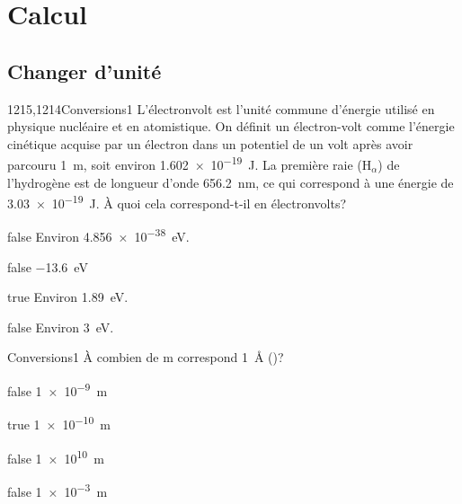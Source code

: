\documentclass[11pt]{article}
\begin{document}
\tableofcontents

\section{Calcul}
	\subsection{Changer d'unité}
		\begin{question}{1215,1214}{Conversions}{1}{}
            L'électronvolt est l'unité commune d'énergie utilisé en physique nucléaire et en atomistique. On définit un électron-volt comme l'énergie cinétique acquise par un électron dans un potentiel de un volt après avoir parcouru \SI{1}{\meter}, soit environ \SI{1.602e-19}{\joule}. La première raie (H$_\alpha$) de l'hydrogène est de longueur d'onde \SI{656.2}{\nano\meter}, ce qui correspond à une énergie de \SI{3.03e-19}{\joule}. À quoi cela correspond-t-il en électronvolts?
        \end{question}
        \begin{reponses}
		    \item[false] Environ \SI{4.856e-38}{\electronvolt}.
		    \item[false] \SI{-13.6}{\electronvolt}
		    \item[true] Environ \SI{1.89}{\electronvolt}.
		    \item[false] Environ \SI{3}{\electronvolt}.
        \end{reponses}
		
		\begin{question}{}{Conversions}{1}{}
            À combien de \si{\meter} correspond \SI{1}{\angstrom} ()?
        \end{question}
        \begin{reponses}
            \item[false] \SI{1e-9}{\meter}
            \item[true] \SI{1e-10}{\meter}
            \item[false] \SI{1e10}{\meter}
            \item[false] \SI{1e-3}{\meter}
        \end{reponses}
		
\end{document}
